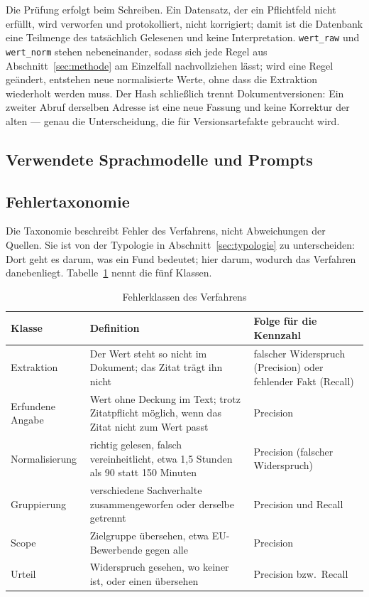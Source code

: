 Die Prüfung erfolgt beim Schreiben. Ein Datensatz, der ein Pflichtfeld nicht erfüllt, wird
verworfen und protokolliert, nicht korrigiert; damit ist die Datenbank eine Teilmenge des
tatsächlich Gelesenen und keine Interpretation. \texttt{wert\_raw} und \texttt{wert\_norm}
stehen nebeneinander, sodass sich jede Regel aus Abschnitt~\ref{sec:methode} am Einzelfall
nachvollziehen lässt; wird eine Regel geändert, entstehen neue normalisierte Werte, ohne
dass die Extraktion wiederholt werden muss. Der Hash schließlich trennt Dokumentversionen:
Ein zweiter Abruf derselben Adresse ist eine neue Fassung und keine Korrektur der alten ---
genau die Unterscheidung, die für Versionsartefakte gebraucht wird.

\subsection{Verwendete Sprachmodelle und Prompts}
\label{app:modelle}

\subsection{Fehlertaxonomie}
\label{app:fehlertaxonomie}

Die Taxonomie beschreibt Fehler des Verfahrens, nicht Abweichungen der Quellen. Sie ist von
der Typologie in Abschnitt~\ref{sec:typologie} zu unterscheiden: Dort geht es darum, was ein
Fund bedeutet; hier darum, wodurch das Verfahren danebenliegt. Tabelle~\ref{tab:fehler}
nennt die fünf Klassen.

\begin{table}[ht]
  \centering
  \caption{Fehlerklassen des Verfahrens}
  \label{tab:fehler}
  \small
  \begin{tabular}{@{}>{\raggedright\arraybackslash}p{}>{\raggedright\arraybackslash}p{}>{\raggedright\arraybackslash}p{}@{}}
    \toprule
    Klasse & Definition & Folge für die Kennzahl \\
    \midrule
    Extraktion & Der Wert steht so nicht im Dokument; das Zitat trägt ihn nicht & falscher Widerspruch (Precision) oder fehlender Fakt (Recall) \\
    Erfundene Angabe & Wert ohne Deckung im Text; trotz Zitatpflicht möglich, wenn das Zitat nicht zum Wert passt & Precision \\
    Normalisierung & richtig gelesen, falsch vereinheitlicht, etwa 1,5 Stunden als 90 statt 150 Minuten & Precision (falscher Widerspruch) \\
    Gruppierung & verschiedene Sachverhalte zusammengeworfen oder derselbe getrennt & Precision und Recall \\
    Scope & Zielgruppe übersehen, etwa EU-Bewerbende gegen alle & Precision \\
    Urteil & Widerspruch gesehen, wo keiner ist, oder einen übersehen & Precision bzw.\ Recall \\
    \bottomrule
  \end{tabular}
\end{table}

